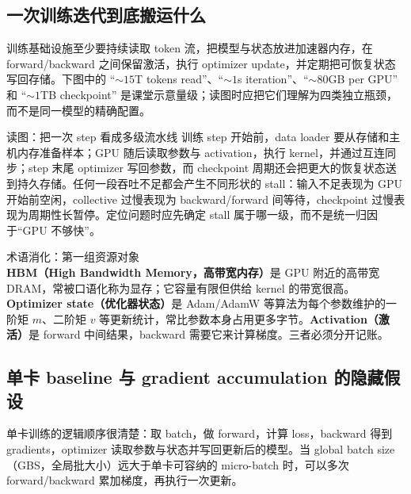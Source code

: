 \subsection{一次训练迭代到底搬运什么}

训练基础设施至少要持续读取 token 流，把模型与状态放进加速器内存，在 forward/backward 之间保留激活，执行 optimizer update，并定期把可恢复状态写回存储。下图中的 ``$\sim15$T tokens read''、``$\sim1$s iteration''、``$\sim80$GB per GPU'' 和 ``$\sim1$TB checkpoint'' 是课堂示意量级；读图时应把它们理解为四类独立瓶颈，而不是同一模型的精确配置。


\begin{knowledgebox}{读图：把一次 step 看成多级流水线}
训练 step 开始前，data loader 要从存储和主机内存准备样本；GPU 随后读取参数与 activation，执行 kernel，并通过互连同步；step 末尾 optimizer 写回参数，而 checkpoint 周期还会把更大的恢复状态送到持久存储。任何一段吞吐不足都会产生不同形状的 stall：输入不足表现为 GPU 开始前空闲，collective 过慢表现为 backward/forward 间等待，checkpoint 过慢表现为周期性长暂停。定位问题时应先确定 stall 属于哪一级，而不是统一归因于“GPU 不够快”。
\end{knowledgebox}

\begin{knowledgebox}{术语消化：第一组资源对象}
\textbf{HBM（High Bandwidth Memory，高带宽内存）}是 GPU 附近的高带宽 DRAM，常被口语化称为显存；它容量有限但供给 kernel 的带宽很高。\textbf{Optimizer state（优化器状态）}是 Adam/AdamW 等算法为每个参数维护的一阶矩 $m$、二阶矩 $v$ 等更新统计，常比参数本身占用更多字节。\textbf{Activation（激活）}是 forward 中间结果，backward 需要它来计算梯度。三者必须分开记账。
\end{knowledgebox}

\subsection{单卡 baseline 与 gradient accumulation 的隐藏假设}

单卡训练的逻辑顺序很清楚：取 batch，做 forward，计算 loss，backward 得到 gradients，optimizer 读取参数与状态并写回更新后的模型。当 global batch size（GBS，全局批大小）远大于单卡可容纳的 micro-batch 时，可以多次 forward/backward 累加梯度，再执行一次更新。


